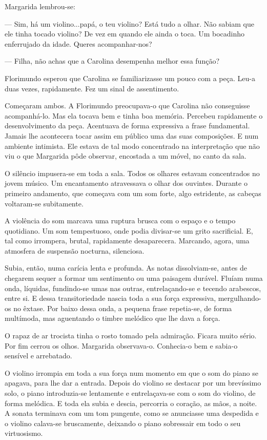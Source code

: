 Margarida lembrou-se:

--- Sim, há um violino...papá, o teu violino? Está tudo a olhar. Não
sabiam que ele tinha tocado violino? De vez em quando ele ainda o toca.
Um bocadinho enferrujado da idade. Queres acompanhar-nos?

--- Filha, não achas que a Carolina desempenha melhor essa função?

Florimundo esperou que Carolina se familiarizasse um pouco com a peça.
Leu-a duas vezes, rapidamente. Fez um sinal de assentimento.

Começaram ambos. A Florimundo preocupava-o que Carolina não conseguisse
acompanhá-lo. Mas ela tocava bem e tinha boa memória. Percebeu
rapidamente o desenvolvimento da peça. Acentuava de forma expressiva a
frase fundamental. Jamais lhe acontecera tocar assim em público uma das
suas composições. E num ambiente intimista. Ele estava de tal modo
concentrado na interpretação que não viu o que Margarida pôde observar,
encostada a um móvel, no canto da sala.

O silêncio impusera-se em toda a sala. Todos os olhares estavam
concentrados no jovem músico. Um encantamento atravessava o olhar dos
ouvintes. Durante o primeiro andamento, que começava com um som forte,
algo estridente, as cabeças voltaram-se subitamente.

A violência do som marcava uma ruptura brusca com o espaço e o tempo
quotidiano. Um som tempestuoso, onde podia divisar-se um grito
sacrificial. E, tal como irrompera, brutal, rapidamente desaparecera.
Marcando, agora, uma atmosfera de suspensão nocturna, silenciosa.

Subia, então, numa carícia lenta e profunda. As notas dissolviam-se,
antes de chegarem sequer a formar um sentimento ou uma paisagem durável.
Fluíam numa onda, líquidas, fundindo-se umas nas outras, entrelaçando-se
e tecendo arabescos, entre si. E dessa transitoriedade nascia toda a sua
força expressiva, mergulhando-os no êxtase. Por baixo dessa onda, a
pequena frase repetia-se, de forma multímoda, mas aguentando o timbre
melódico que lhe dava a força.

O rapaz de ar trocista tinha o rosto tomado pela admiração. Ficara muito
sério. Por fim cerrou os olhos. Margarida observava-o. Conhecia-o bem e
sabia-o sensível e arrebatado.

O violino irrompia em toda a sua força num momento em que o som do piano
se apagava, para lhe dar a entrada. Depois do violino se destacar por um
brevíssimo solo, o piano introduzia-se lentamente e entrelaçava-se com o
som do violino, de forma melódica. E toda ela subia e descia, percorria
o coração, as mãos, a noite. A sonata terminava com um tom pungente,
como se anunciasse uma despedida e o violino calava-se bruscamente,
deixando o piano sobressair em todo o seu virtuosismo.

